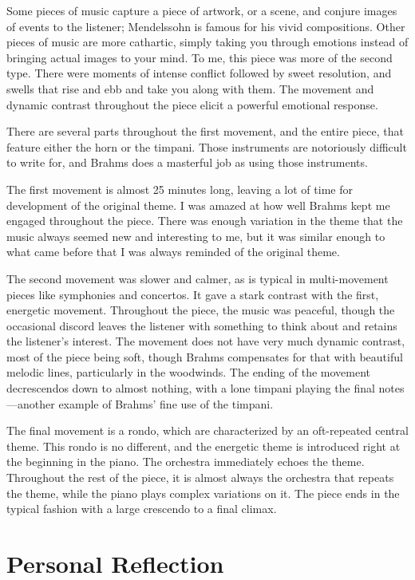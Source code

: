 \documentclass[onecolumn, 12pt]{article}
\begin{document}
Some pieces of music capture a piece of artwork, or a scene, and conjure images
of events to the listener; Mendelssohn is famous for his vivid compositions.
Other pieces of music are more cathartic, simply taking you through emotions
instead of bringing actual images to your mind.  To me, this piece was more of
the second type.  There were moments of intense conflict followed by sweet
resolution, and swells that rise and ebb and take you along with them.  The
movement and dynamic contrast throughout the piece elicit a powerful emotional
response.

There are several parts throughout the first movement, and the entire piece,
that feature either the horn or the timpani.  Those instruments are notoriously
difficult to write for, and Brahms does a masterful job as using those
instruments. 

The first movement is almost 25 minutes long, leaving a lot of time for development of the original theme.  I was amazed at how well Brahms kept me engaged
throughout the piece.  There was enough variation in the theme that the music
always seemed new and interesting to me, but it was similar enough to what came
before that I was always reminded of the original theme.

The second movement was slower and calmer, as is typical in multi-movement
pieces like symphonies and concertos.  It gave a stark contrast with the first,
energetic movement.  Throughout the piece, the music was peaceful, though the
occasional discord leaves the listener with something to think about and
retains the listener's interest.  The movement does not have very much dynamic
contrast, most of the piece being soft, though Brahms compensates for that with
beautiful melodic lines, particularly in the woodwinds.  The ending of the
movement decrescendos down to almost nothing, with a lone timpani playing the
final notes---another example of Brahms' fine use of the timpani.

The final movement is a rondo, which are characterized by an oft-repeated
central theme.  This rondo is no different, and the energetic theme is
introduced right at the beginning in the piano.  The orchestra immediately
echoes the theme.  Throughout the rest of the piece, it is almost always the
orchestra that repeats the theme, while the piano plays complex variations on
it.  The piece ends in the typical fashion with a large crescendo to a final 
climax.

\section*{Personal Reflection}
\end{document}
